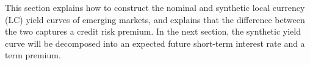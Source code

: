 This section explains how to construct the nominal and synthetic local currency (LC) yield curves of emerging markets, and explains that
the difference between the two captures a credit risk premium.
In the next section, the synthetic yield curve will be decomposed into an expected future short-term interest rate and a term premium. 

